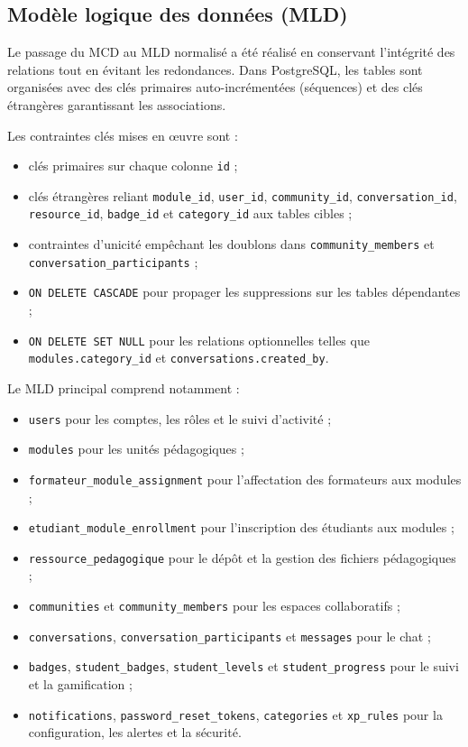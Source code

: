 \documentclass[12pt,a4paper,oneside]{report}
\begin{document}
\subsection{Modèle logique des données (MLD)}

Le passage du MCD au MLD normalisé a été réalisé en conservant l'intégrité des relations tout en évitant les redondances. Dans PostgreSQL, les tables sont organisées avec des clés primaires auto-incrémentées (séquences) et des clés étrangères garantissant les associations.

Les contraintes clés mises en œuvre sont :
\begin{itemize}
  \item clés primaires sur chaque colonne \texttt{id} ;
  \item clés étrangères reliant \texttt{module\_id}, \texttt{user\_id}, \texttt{community\_id}, \texttt{conversation\_id}, \texttt{resource\_id}, \texttt{badge\_id} et \texttt{category\_id} aux tables cibles ;
  \item contraintes d'unicité empêchant les doublons dans \texttt{community\_members} et \texttt{conversation\_participants} ;
  \item \texttt{ON DELETE CASCADE} pour propager les suppressions sur les tables dépendantes ;
  \item \texttt{ON DELETE SET NULL} pour les relations optionnelles telles que \texttt{modules.category\_id} et \texttt{conversations.created\_by}.
\end{itemize}

Le MLD principal comprend notamment :
\begin{itemize}
  \item \texttt{users} pour les comptes, les rôles et le suivi d'activité ;
  \item \texttt{modules} pour les unités pédagogiques ;
  \item \texttt{formateur\_module\_assignment} pour l'affectation des formateurs aux modules ;
  \item \texttt{etudiant\_module\_enrollment} pour l'inscription des étudiants aux modules ;
  \item \texttt{ressource\_pedagogique} pour le dépôt et la gestion des fichiers pédagogiques ;
  \item \texttt{communities} et \texttt{community\_members} pour les espaces collaboratifs ;
  \item \texttt{conversations}, \texttt{conversation\_participants} et \texttt{messages} pour le chat ;
  \item \texttt{badges}, \texttt{student\_badges}, \texttt{student\_levels} et \texttt{student\_progress} pour le suivi et la gamification ;
  \item \texttt{notifications}, \texttt{password\_reset\_tokens}, \texttt{categories} et \texttt{xp\_rules} pour la configuration, les alertes et la sécurité.
\end{itemize}
\end{document}
